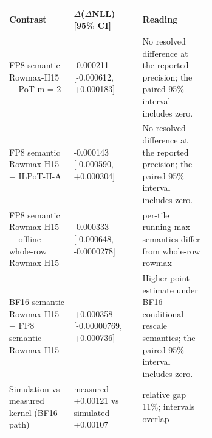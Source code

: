 {\scriptsize
\setlength{\tabcolsep}{2pt}
\begin{longtable}{@{}>{\raggedright\arraybackslash}p{0.32\linewidth}l>{\raggedright\arraybackslash}p{0.34\linewidth}@{}}
\toprule
\textbf{Contrast} & \textbf{$\Delta$($\Delta$NLL) [95\% CI]} & \textbf{Reading} \\
\midrule
\endhead
FP8 semantic Rowmax-H15 $-$ PoT m = 2 & -0.000211 [-0.000612, +0.000183] & No resolved difference at the reported precision; the paired 95\% interval includes zero. \\
FP8 semantic Rowmax-H15 $-$ ILPoT-H-A & -0.000143 [-0.000590, +0.000304] & No resolved difference at the reported precision; the paired 95\% interval includes zero. \\
FP8 semantic Rowmax-H15 $-$ offline whole-row Rowmax-H15 & -0.000333 [-0.000648, -0.0000278] & per-tile running-max semantics differ from whole-row rowmax \\
BF16 semantic Rowmax-H15 $-$ FP8 semantic Rowmax-H15 & +0.000358 [-0.00000769, +0.000736] & Higher point estimate under BF16 conditional-rescale semantics; the paired 95\% interval includes zero. \\
Simulation vs measured kernel (BF16 path) & measured +0.00121 vs simulated +0.00107 & relative gap 11\%; intervals overlap \\
\bottomrule
\end{longtable}
\addtocounter{table}{-1}
}
\par{}\par
\endgroup
